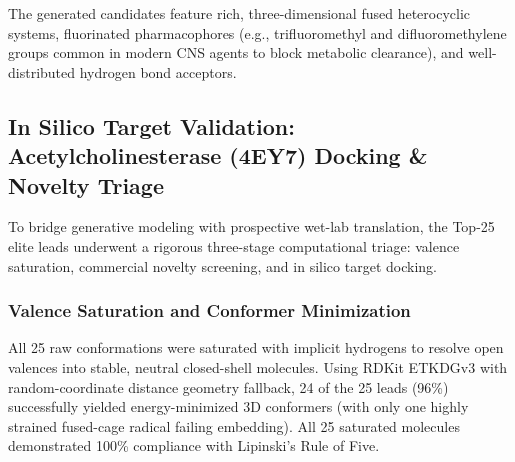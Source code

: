\documentclass[11pt, a4paper]{article}
\begin{document}
\begin{table}[H]
\centering
\caption{Medicinal Chemistry Profile of Top-25 V5 Elite Drug Candidates.}
\label{tab:admet_profile}
\end{table}

The generated candidates feature rich, three-dimensional fused heterocyclic systems, fluorinated pharmacophores (e.g., trifluoromethyl and difluoromethylene groups common in modern CNS agents to block metabolic clearance), and well-distributed hydrogen bond acceptors.

\subsection{In Silico Target Validation: Acetylcholinesterase (4EY7) Docking \& Novelty Triage}
To bridge generative modeling with prospective wet-lab translation, the Top-25 elite leads underwent a rigorous three-stage computational triage: valence saturation, commercial novelty screening, and in silico target docking.

\subsubsection{Valence Saturation and Conformer Minimization}
All 25 raw conformations were saturated with implicit hydrogens to resolve open valences into stable, neutral closed-shell molecules. Using RDKit ETKDGv3 with random-coordinate distance geometry fallback, 24 of the 25 leads (96\%) successfully yielded energy-minimized 3D conformers (with only one highly strained fused-cage radical failing embedding). All 25 saturated molecules demonstrated 100\% compliance with Lipinski's Rule of Five.
\end{document}

